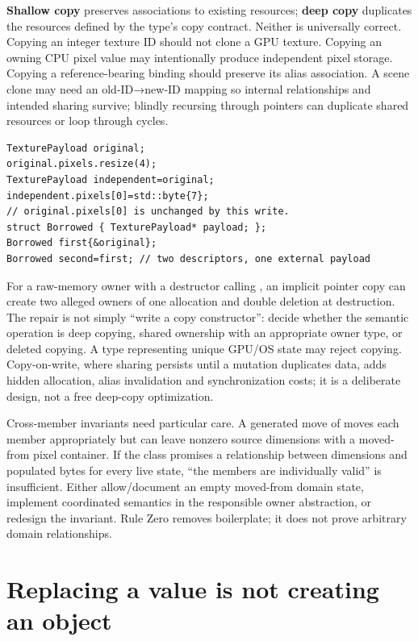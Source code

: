 \textbf{Shallow copy} preserves associations to existing resources; \textbf{deep copy} duplicates the resources defined by the type's copy contract. Neither is universally correct. Copying an integer texture ID should not clone a GPU texture. Copying an owning CPU pixel value may intentionally produce independent pixel storage. Copying a reference-bearing binding should preserve its alias association. A scene clone may need an old-ID→new-ID mapping so internal relationships and intended sharing survive; blindly recursing through pointers can duplicate shared resources or loop through cycles.

\begin{verbatim}
TexturePayload original;
original.pixels.resize(4);
TexturePayload independent=original;
independent.pixels[0]=std::byte{7};
// original.pixels[0] is unchanged by this write.
struct Borrowed { TexturePayload* payload; };
Borrowed first{&original};
Borrowed second=first; // two descriptors, one external payload
\end{verbatim}

For a raw-memory owner with a destructor calling , an implicit pointer copy can create two alleged owners of one allocation and double deletion at destruction. The repair is not simply ``write a copy constructor'': decide whether the semantic operation is deep copying, shared ownership with an appropriate owner type, or deleted copying. A type representing unique GPU/OS state may reject copying. Copy-on-write, where sharing persists until a mutation duplicates data, adds hidden allocation, alias invalidation and synchronization costs; it is a deliberate design, not a free deep-copy optimization.

Cross-member invariants need particular care. A generated move of  moves each member appropriately but can leave nonzero source dimensions with a moved-from pixel container. If the class promises a relationship between dimensions and populated bytes for every live state, ``the members are individually valid'' is insufficient. Either allow/document an empty moved-from domain state, implement coordinated semantics in the responsible owner abstraction, or redesign the invariant. Rule Zero removes boilerplate; it does not prove arbitrary domain relationships.

\section{Replacing a value is not creating an object}\label{01-foundations-i-ch003-replacing-a-value-is-not-creating-an-object}


